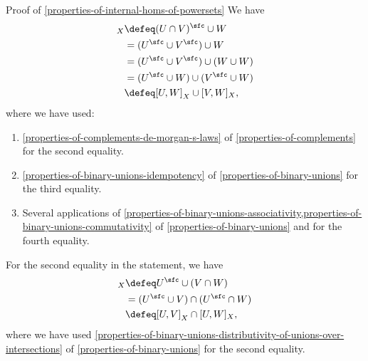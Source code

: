 \begin{Proof}{Proof of \cref{properties-of-internal-homs-of-powersets}}
    We have
    \begin{align*}
        [U\cap V,W]_{X} &\defeq (U\cap V)^{\sfc}\cup W\\
                        &=      (U^{\sfc}\cup V^{\sfc})\cup W\\
                        &=      (U^{\sfc}\cup V^{\sfc})\cup(W\cup W)\\
                        &=      (U^{\sfc}\cup W)\cup(V^{\sfc}\cup W)\\
                        &\defeq [U,W]_{X}\cup[V,W]_{X},
    \end{align*}
    where we have used:
    \begin{enumerate}
        \item\label{proof-of-properties-of-internal-homs-of-powersets-interaction-with-binary-unions-1}\cref{properties-of-complements-de-morgan-s-laws} of \cref{properties-of-complements} for the second equality.
        \item\label{proof-of-properties-of-internal-homs-of-powersets-interaction-with-binary-unions-2}\cref{properties-of-binary-unions-idempotency} of \cref{properties-of-binary-unions} for the third equality.
        \item\label{proof-of-properties-of-internal-homs-of-powersets-interaction-with-binary-unions-3}Several applications of \cref{properties-of-binary-unions-associativity,properties-of-binary-unions-commutativity} of \cref{properties-of-binary-unions} and for the fourth equality.
    \end{enumerate}
    For the second equality in the statement, we have
    \begin{align*}
        [U,V\cap W]_{X} &\defeq U^{\sfc}\cup(V\cap W)\\
                        &=      (U^{\sfc}\cup V)\cap(U^{\sfc}\cap W)\\
                        &\defeq [U,V]_{X}\cap[U,W]_{X},
    \end{align*}
    where we have used \cref{properties-of-binary-unions-distributivity-of-unions-over-intersections} of \cref{properties-of-binary-unions} for the second equality.


\end{Proof}
